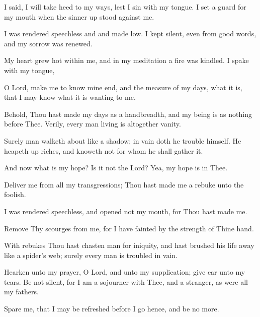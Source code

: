 I said, I will take heed to my ways, lest I sin with my tongue. I set a guard for my mouth when the sinner up stood against me.

I was rendered speechless and and made low. I kept silent, even from good words, and my sorrow was renewed.

My heart grew hot within me, and in my meditation a fire was kindled. I spake with my tongue,

O Lord, make me to know mine end, and the measure of my days, what it is, that I may know what it is wanting to me.

Behold, Thou hast made my days as a handbreadth, and my being is as nothing before Thee. Verily, every man living is altogether vanity.

Surely man walketh about like a shadow; in vain doth he trouble himself. He heapeth up riches, and knoweth not for whom he shall gather it.

And now what is my hope? Is it not the Lord? Yea, my hope is in Thee.

Deliver me from all my transgressions; Thou hast made me a rebuke unto the foolish.

I was rendered speechless, and opened not my mouth, for Thou hast made me.

Remove Thy scourges from me, for I have fainted by the strength of Thine hand.

With rebukes Thou hast chasten man for iniquity, and hast brushed his life away like a spider's web; surely every man is troubled in vain.

Hearken unto my prayer, O Lord, and unto my supplication; give ear unto my tears. Be not silent, for I am a sojourner with Thee, and a stranger, as were all my fathers.

Spare me, that I may be refreshed before I go hence, and be no more.
